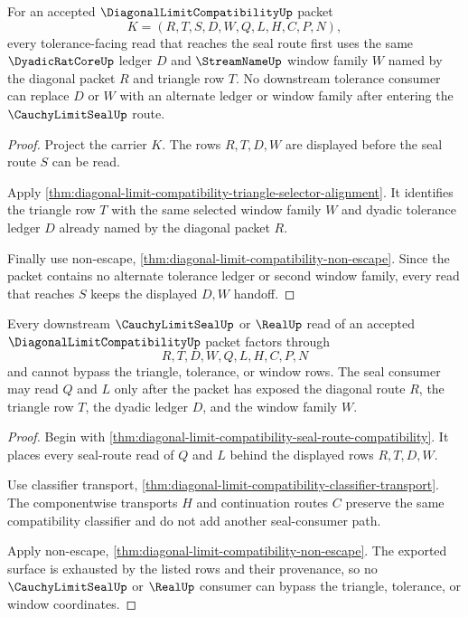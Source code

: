 \begin{theorem}
\label{thm:diagonal-limit-compatibility-tolerance-ledger-handoff}
For an accepted $\DiagonalLimitCompatibilityUp$ packet
$$
K=(R,T,S,D,W,Q,L,H,C,P,N),
$$
every tolerance-facing read that reaches the seal route first uses the same $\DyadicRatCoreUp$ ledger $D$ and $\StreamNameUp$ window family $W$ named by the diagonal packet $R$ and triangle row $T$. No downstream tolerance consumer can replace $D$ or $W$ with an alternate ledger or window family after entering the $\CauchyLimitSealUp$ route.
\end{theorem}
\begin{proof}
Project the carrier $K$. The rows $R,T,D,W$ are displayed before the seal route $S$ can be read.

Apply \autoref{thm:diagonal-limit-compatibility-triangle-selector-alignment}. It identifies the triangle row $T$ with the same selected window family $W$ and dyadic tolerance ledger $D$ already named by the diagonal packet $R$.

Finally use non-escape, \autoref{thm:diagonal-limit-compatibility-non-escape}. Since the packet contains no alternate tolerance ledger or second window family, every read that reaches $S$ keeps the displayed $D,W$ handoff.
\end{proof}

\begin{theorem}
\label{thm:diagonal-limit-compatibility-seal-consumer-factorization}
Every downstream $\CauchyLimitSealUp$ or $\RealUp$ read of an accepted $\DiagonalLimitCompatibilityUp$ packet factors through
$$
R,T,D,W,Q,L,H,C,P,N
$$
and cannot bypass the triangle, tolerance, or window rows. The seal consumer may read $Q$ and $L$ only after the packet has exposed the diagonal route $R$, the triangle row $T$, the dyadic ledger $D$, and the window family $W$.
\end{theorem}
\begin{proof}
Begin with \autoref{thm:diagonal-limit-compatibility-seal-route-compatibility}. It places every seal-route read of $Q$ and $L$ behind the displayed rows $R,T,D,W$.

Use classifier transport, \autoref{thm:diagonal-limit-compatibility-classifier-transport}. The componentwise transports $H$ and continuation routes $C$ preserve the same compatibility classifier and do not add another seal-consumer path.

Apply non-escape, \autoref{thm:diagonal-limit-compatibility-non-escape}. The exported surface is exhausted by the listed rows and their provenance, so no $\CauchyLimitSealUp$ or $\RealUp$ consumer can bypass the triangle, tolerance, or window coordinates.
\end{proof}

